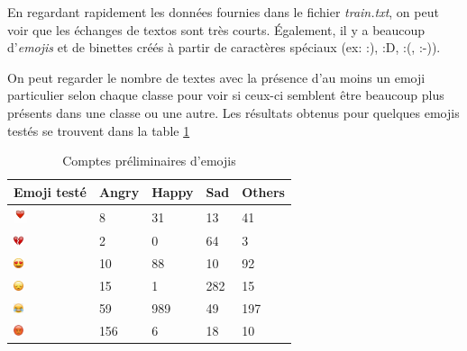 En regardant rapidement les données fournies dans le fichier \emph{train.txt}, on peut voir que les échanges de textos sont très courts. Également, il y a beaucoup d'\emph{emojis} et de binettes créés à partir de caractères spéciaux (ex: :), :D, :(, :-)).

On peut regarder le nombre de textes avec la présence d'au moins un emoji particulier selon chaque classe pour voir si ceux-ci semblent être beaucoup plus présents dans une classe ou une autre. Les résultats obtenus pour quelques emojis testés se trouvent dans la table \ref{table:emojis}

\begin{table}[]
	\centering
	\caption{Comptes préliminaires d'emojis}
	\label{table:emojis}
	\begin{tabular}{@{}lllll@{}}
		\toprule
		Emoji testé & Angry & Happy & Sad & Others \\ \midrule
		\includegraphics[height=0.5cm]{images/heart}          & 8     & 31    & 13  & 41     \\
		\includegraphics[height=0.3cm]{images/broken_heart}          & 2     & 0     & 64  & 3      \\
		\includegraphics[height=0.3cm]{images/heart_eyes}          & 10    & 88    & 10  & 92     \\
		\includegraphics[height=0.3cm]{images/sad}          & 15    & 1     & 282 & 15     \\
		\includegraphics[height=0.3cm]{images/laughter}          & 59    & 989   & 49  & 197    \\
		\includegraphics[height=0.3cm]{images/angry}          & 156   & 6     & 18  & 10     \\ \bottomrule
	\end{tabular}
\end{table}

